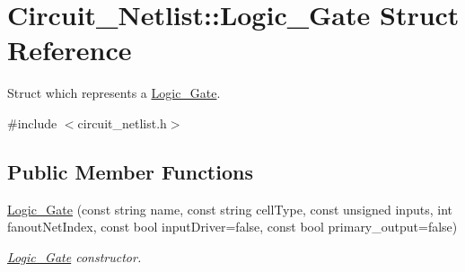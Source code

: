 \hypertarget{structCircuit__Netlist_1_1Logic__Gate}{\section{Circuit\-\_\-\-Netlist\-:\-:Logic\-\_\-\-Gate Struct Reference}
\label{structCircuit__Netlist_1_1Logic__Gate}
}


Struct which represents a \hyperlink{structCircuit__Netlist_1_1Logic__Gate}{Logic\-\_\-\-Gate}.  




{\ttfamily \#include $<$circuit\-\_\-netlist.\-h$>$}

\subsection*{Public Member Functions}
\begin{DoxyCompactItemize}
\item 
\hyperlink{structCircuit__Netlist_1_1Logic__Gate_a81569a5c27c575b1725c5da2c2090f54}{Logic\-\_\-\-Gate} (const string name, const string cell\-Type, const unsigned inputs, int fanout\-Net\-Index, const bool input\-Driver=false, const bool primary\-\_\-output=false)
\begin{DoxyCompactList}\small\item\em \hyperlink{structCircuit__Netlist_1_1Logic__Gate}{Logic\-\_\-\-Gate} constructor. \end{DoxyCompactList}\end{DoxyCompactItemize}
